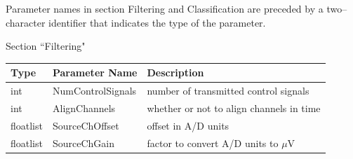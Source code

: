 \documentclass[letterpaper,oneside,12pt]{book}
\newcommand{\todo}[1]{}
\begin{document}
\begin{flushleft}
\vspace{.5cm}
Parameter names in section Filtering and Classification are preceded by 
a two--character identifier that indicates the type of the parameter.
\todo{Documentation of Parameters and States can be done automatically using \texttt{make docinfo}.}

\vspace{.5cm}

\newpage

\large Section ``Filtering" \normalsize \\[1ex]

 \begin{tabular}{|l|l|l|}
  \hline
  \textbf{Type} & \textbf{Parameter Name} & \textbf{Description}\\
  \hline
  int & NumControlSignals & number of transmitted control signals \\
  \hline
  int & AlignChannels & whether or not to align channels in time \\
  \hline
  floatlist & SourceChOffset & offset in A/D units\\
  \hline
  floatlist & SourceChGain & factor to convert A/D units to $\mu$V \\
  \hline
 \end{tabular}




\end{flushleft}
\end{document}
